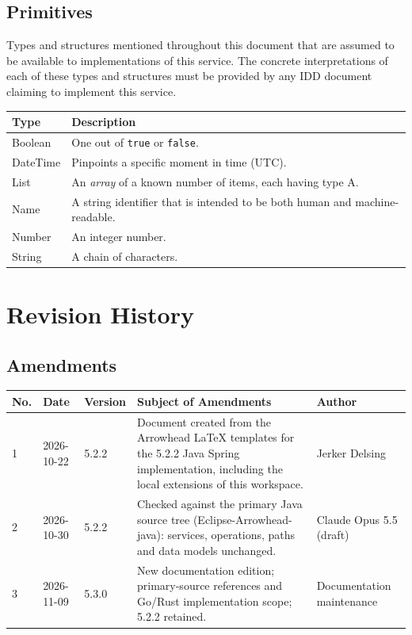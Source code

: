 \documentclass[a4paper]{arrowhead}
\newcommand{\pdef}[1]{{\textcolor{ArrowheadGrey}{#1\label{sec:model:primitives:#1}\label{sec:model:primitives:#1s}\label{sec:model:primitives:#1es}}}}
\begin{document}
\subsection{Primitives}
\label{sec:model:primitives}

Types and structures mentioned throughout this document that are assumed to be available to implementations of this service.
The concrete interpretations of each of these types and structures must be provided by any IDD document claiming to implement this service.

\noindent\begin{tabularx}{\textwidth}{| p{4.6cm} | X |} \hline
\rowcolor{gray!33} Type & Description \\ \hline
\pdef{Boolean} & One out of \texttt{true} or \texttt{false}. \\ \hline
\pdef{DateTime} & Pinpoints a specific moment in time (UTC). \\ \hline
\pdef{List} & An \textit{array} of a known number of items, each having type A. \\ \hline
\pdef{Name} & A string identifier that is intended to be both human and machine-readable. \\ \hline
\pdef{Number} & An integer number. \\ \hline
\pdef{String} & A chain of characters. \\ \hline
\end{tabularx}

\newpage




\newpage

\section{Revision History}
\subsection{Amendments}

\noindent\begin{tabularx}{\textwidth}{| p{1cm} | p{3cm} | p{2cm} | X | p{4cm} |} \hline
\rowcolor{gray!33} No. & Date & Version & Subject of Amendments & Author \\ \hline

1 & 2026-10-22 & 5.2.2 & Document created from the Arrowhead LaTeX templates for the 5.2.2 Java Spring implementation, including the local extensions of this workspace. & Jerker Delsing \\ \hline
2 & 2026-10-30 & 5.2.2 & Checked against the primary Java source tree (Eclipse-Arrowhead-java): services, operations, paths and data models unchanged. & Claude Opus 5.5 (draft) \\ \hline
3 & 2026-11-09 & 5.3.0 & New documentation edition; primary-source references and Go/Rust implementation scope; 5.2.2 retained. & Documentation maintenance \\ \hline
\end{tabularx}
\end{document}
